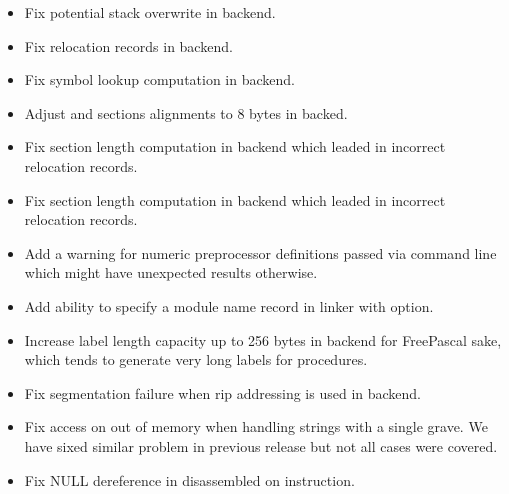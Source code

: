 \begin{itemize}
    \item{Fix potential stack overwrite in  backend.}

    \item{Fix relocation records in  backend.}

    \item{Fix symbol lookup computation in  backend.}

    \item{Adjust  and  sections alignments to 8 bytes
        in  backed.}

    \item{Fix section length computation in  backend which leaded in incorrect
        relocation records.}
\end{itemize}


\begin{itemize}
    \item{Fix section length computation in  backend which leaded in incorrect
        relocation records.}

    \item{Add a warning for numeric preprocessor definitions passed via command
        line which might have unexpected results otherwise.}

    \item{Add ability to specify a module name record in  linker with
         option.}

    \item{Increase label length capacity up to 256 bytes in  backend for
        FreePascal sake, which tends to generate very long labels for procedures.}

    \item{Fix segmentation failure when rip addressing is used in  backend.}

    \item{Fix access on out of memory when handling strings with a single
        grave. We have sixed similar problem in previous release but not
        all cases were covered.}

    \item{Fix NULL dereference in disassembled on  instruction.}
\end{itemize}


